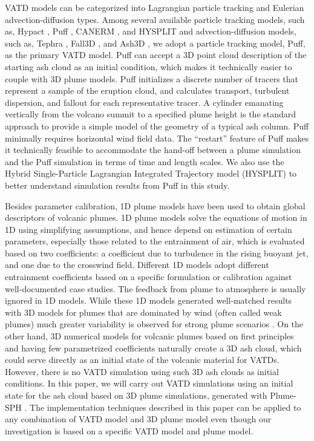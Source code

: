 \documentclass[utf8]{frontiersSCNS} %
\begin{document}
VATD models can be categorized into Lagrangian particle tracking and Eulerian advection-diffusion types. Among several available particle tracking models, such as, Hypact \citep{walko1995hypact}, Puff \citep{searcy1998puff}, CANERM \citep{d1998modeling}, and HYSPLIT \citep{draxler1998overview} and advection-diffusion models, such as, Tephra \citep{bonadonna2005total}, Fall3D \citep{folch2009fall3d}, and Ash3D \citep{schwaiger2012ash3d}, we adopt a particle tracking model, Puff, as the primary VATD model. Puff can accept a 3D point cloud description of the starting ash cloud as an initial condition, which makes it technically easier to couple with 3D plume models. Puff initializes a discrete number of tracers that represent a sample of the eruption cloud, and calculates transport, turbulent dispersion, and fallout for each representative tracer. A cylinder emanating vertically from the volcano summit to a specified plume height is the standard approach to provide a simple model of the geometry of a typical ash column. Puff minimally requires horizontal wind field data. The ``restart'' feature of Puff makes it technically feasible to accommodate the hand-off between a plume simulation and the Puff simulation in terms of time and length scales. We also use the Hybrid Single-Particle Lagrangian Integrated Trajectory model (HYSPLIT) \citep{stein2015noaa, rolph2017real} to better understand simulation results from Puff in this study. 

Besides parameter calibration, 1D plume models have been used to obtain global descriptors of volcanic plumes. 1D plume models \citep [e.g.][]{woods1988fluid, bursik2001effect, mastin2007user, de2015plume, folch2016fplume, pouget2016sensitivity} solve the equations of motion in 1D using simplifying assumptions, and hence depend on estimation of certain parameters, especially those related to the entrainment of air, which is evaluated based on two coefficients: a coefficient due to turbulence in the rising buoyant jet, and one due to the crosswind field. Different 1D models adopt different entrainment coefficients based on a specific formulation or calibration against well-documented case studies. The feedback from plume to atmosphere is usually ignored in 1D models. While these 1D models generated well-matched results with 3D models for plumes that are dominated by wind (often called weak plumes) much greater variability is observed for strong plume scenarios \citep{bursik2009volcanic, costa2016results}. On the other hand, 3D numerical models for volcanic plumes based on first principles and having few parametrized coefficients \citep{oberhuber1998volcanic, neri2003multiparticle, suzuki2005numerical, cerminara2016ashee, cao2018plume} naturally create a 3D ash cloud, which could serve directly as an initial state of the volcanic material for VATDs. However, there is no VATD simulation using such 3D ash clouds as initial conditions. In this paper, we will carry out VATD simulations using an initial state for the ash cloud based on 3D plume simulations, generated with Plume-SPH \citep{cao2018plume, cao2017data}. The implementation techniques described in this paper can be applied to any combination of VATD model and 3D plume model even though our investigation is based on a specific VATD model and plume model.
\end{document}
